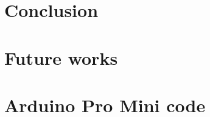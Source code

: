 \documentclass[a4paper, 10pt]{article}
\begin{document}


\section{Conclusion}
\label{sec:conclusion}



\section{Future works}
\label{sec:future}







\appendix
\section{Arduino Pro Mini code}


\end{document}

